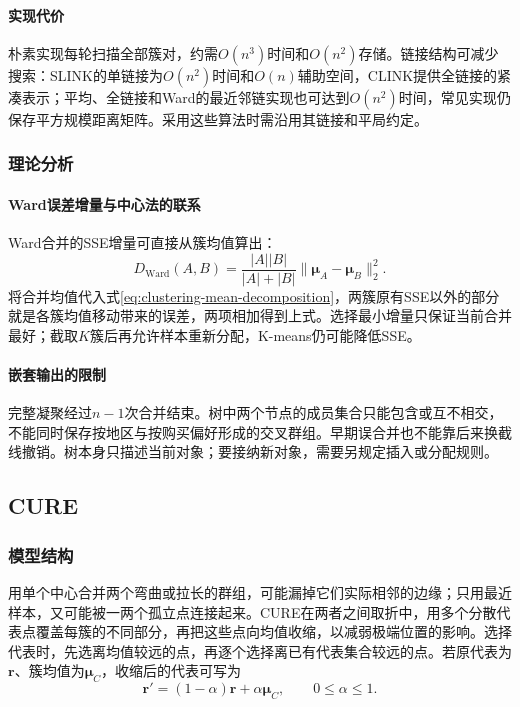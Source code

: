 \paragraph{实现代价}

朴素实现每轮扫描全部簇对，约需$O(n^3)$时间和$O(n^2)$存储。链接结构可减少搜索：SLINK的单链接为$O(n^2)$时间和$O(n)$辅助空间，CLINK提供全链接的紧凑表示；平均、全链接和Ward的最近邻链实现也可达到$O(n^2)$时间，常见实现仍保存平方规模距离矩阵。采用这些算法时需沿用其链接和平局约定。

\subsubsection{理论分析}

\paragraph{Ward误差增量与中心法的联系}

Ward合并的SSE增量可直接从簇均值算出：
\begin{equation}
 D_{\mathrm{Ward}}(A,B)
 =\frac{|A||B|}{|A|+|B|}
  \lVert\bm\mu_A-\bm\mu_B\rVert_2^2.
 \label{eq:clustering-ward-increment}
\end{equation}
将合并均值代入式\eqref{eq:clustering-mean-decomposition}，两簇原有SSE以外的部分就是各簇均值移动带来的误差，两项相加得到上式。选择最小增量只保证当前合并最好；截取$K$簇后再允许样本重新分配，K-means仍可能降低SSE。

\paragraph{嵌套输出的限制}

完整凝聚经过$n-1$次合并结束。树中两个节点的成员集合只能包含或互不相交，不能同时保存按地区与按购买偏好形成的交叉群组。早期误合并也不能靠后来换截线撤销。树本身只描述当前对象；要接纳新对象，需要另规定插入或分配规则。
\subsection{CURE}

\subsubsection{模型结构}

用单个中心合并两个弯曲或拉长的群组，可能漏掉它们实际相邻的边缘；只用最近样本，又可能被一两个孤立点连接起来。CURE在两者之间取折中，用多个分散代表点覆盖每簇的不同部分，再把这些点向均值收缩，以减弱极端位置的影响。选择代表时，先选离均值较远的点，再逐个选择离已有代表集合较远的点。若原代表为$\bm{r}$、簇均值为$\bm{\mu}_C$，收缩后的代表可写为
\[
 \bm{r}'=(1-\alpha)\bm{r}+\alpha\bm{\mu}_C,
 \qquad 0\leq\alpha\leq1.
\]

